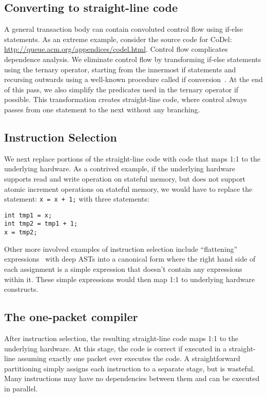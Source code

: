 \subsection{Converting to straight-line code}
A general transaction body can contain convoluted control flow using if-else
statements. As an extreme example, consider the source code for CoDel:
\url{http://queue.acm.org/appendices/codel.html}. Control flow complicates
dependence analysis. We eliminate control flow by transforming if-else
statements using the ternary operator, starting from the innermost if
statements and recursing outwards using a well-known procedure called if
conversion~\cite{allen_if_conversion}. At the end of this pass, we also
simplify the predicates used in the ternary operator if possible. This
transformation creates straight-line code, where control always passes from one
statement to the next without any branching.

\subsection{Instruction Selection}
We next replace portions of the straight-line code with code that maps 1:1 to
the underlying hardware. As a contrived example, if the underlying hardware
supports read and write operation on stateful memory, but does not support
atomic increment operations on stateful memory, we would have to replace the
statement: \texttt{x = x + 1;} with three statements:
\begin{verbatim}
int tmp1 = x;
int tmp2 = tmp1 + 1;
x = tmp2;
\end{verbatim}

Other more involved examples of instruction selection include ``flattening''
expressions~\cite{expression_flattening} with deep ASTs into a canonical form
where the right hand side of each assignment is a simple expression that
doesn't contain any expressions within it. These simple expressions would then
map 1:1 to underlying hardware constructs.

\subsection{The one-packet compiler}
After instruction selection, the resulting straight-line code maps 1:1 to the
underlying hardware. At this stage, the code is correct if executed in a
straight-line assuming exactly one packet ever executes the code. A
straightforward partitioning simply assigns each instruction to a separate
stage, but is wasteful. Many instructions may have no dependencies between them
and can be executed in parallel.

